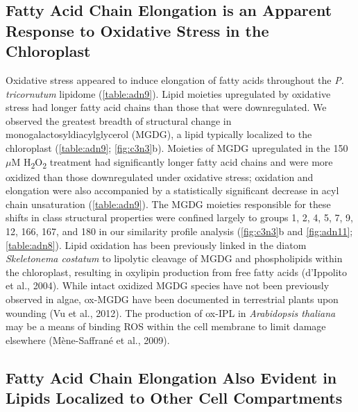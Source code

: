 \subsection{Fatty Acid Chain Elongation is an Apparent Response to Oxidative Stress in the Chloroplast}

Oxidative stress appeared to induce elongation of fatty acids throughout the \emph{P. tricornutum} lipidome (\autoref{table:adn9}). Lipid moieties upregulated by oxidative stress had longer fatty acid chains than those that were downregulated. We observed the greatest breadth of structural change in monogalactosyldiacylglycerol (MGDG), a lipid typically localized to the chloroplast (\autoref{table:adn9}; \autoref{fig:c3n3}b). Moieties of MGDG upregulated in the 150 $\mu$M H\textsubscript{2}O\textsubscript{2} treatment had significantly longer fatty acid chains and were more oxidized than those downregulated under oxidative stress; oxidation and elongation were also accompanied by a statistically significant decrease in acyl chain unsaturation (\autoref{table:adn9}). The MGDG moieties responsible for these shifts in class structural properties were confined largely to groups 1, 2, 4, 5, 7, 9, 12, 166, 167, and 180 in our similarity profile analysis (\autoref{fig:c3n3}b and \autoref{fig:adn11}; \autoref{table:adn8}). Lipid oxidation has been previously linked in the diatom \emph{Skeletonema costatum} to lipolytic cleavage of MGDG and phospholipids within the chloroplast, resulting in oxylipin production from free fatty acids (d'Ippolito et al., 2004). While intact oxidized MGDG species have not been previously observed in algae, ox-MGDG have been documented in terrestrial plants upon wounding (Vu et al., 2012). The production of ox-IPL in \emph{Arabidopsis thaliana} may be a means of binding ROS within the cell membrane to limit damage elsewhere (M\`{e}ne-Saffran\'{e} et al., 2009).

\subsection{Fatty Acid Chain Elongation Also Evident in Lipids Localized to Other Cell Compartments}

